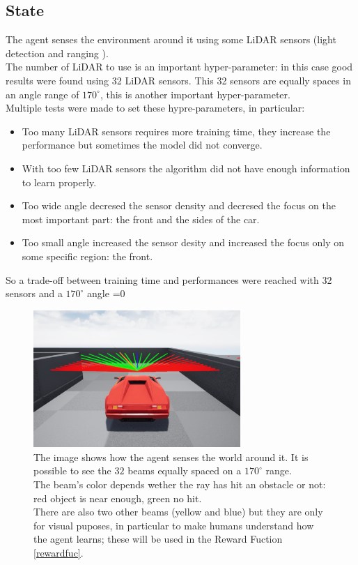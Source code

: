 \documentclass[14pt]{extarticle}
\def\sp{\vspace{5pt}}
\newcounter{debug}
\begin{document}
\begin{flushleft}
	\subsection{State}
	\sp
	The agent senses the environment around it using some LiDAR sensors (light detection and ranging \cite{LiDAR}). \\
	The number of LiDAR to use is an important hyper-parameter: in this case good results were found using 32 LiDAR sensors. This 32 sensors are equally spaces in an angle range of $170^{\circ}$, this is another important hyper-parameter. \\
	Multiple tests were made to set these hypre-parameters, in particular:
	\begin{itemize}
	\item Too many LiDAR sensors requires more training time, they increase the performance but sometimes the model did not converge.
	\item With too few LiDAR sensors the algorithm did not have enough information to learn properly.
	\item Too wide angle decresed the sensor density and decresed the focus on the most important part: the front and the sides of the car.
	\item Too small angle increased the sensor desity and increased the focus only on some specific region: the front.
	\end{itemize}
	So a trade-off between training time and performances were reached with 32 sensors and a $170^{\circ}$ angle
	\ifnum\value{debug}=0 {
	\begin{figure}[H] \label{carState}
    		\centering\includegraphics[width=0.7\textwidth]{./Image/State/carSensors.png}
		\vspace{5mm}
		\caption{The image shows how the agent senses the world around it. It is possible to see the $32$ beams equally spaced on a $170^{\circ}$ range. \\
		The beam's color depends wether the ray has hit an obstacle or not: red object is near enough, green no hit. \\
		There are also two other beams (yellow and blue) but they are only for visual puposes, in particular to make humans understand how the agent learns; these will be used in the Reward Fuction \ref{rewardfuc}.}
	\end{figure}
	}\fi
	

\end{flushleft}
\end{document}
